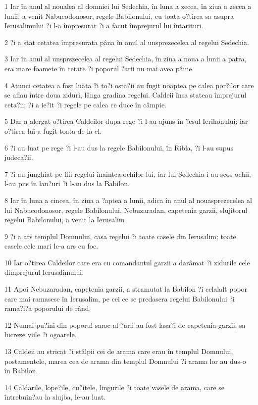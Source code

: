 \par 1 Iar în anul al noualea al domniei lui Sedechia, în luna a zecea, în ziua a zecea a lunii, a venit Nabucodonosor, regele Babilonului, cu toata o?tirea sa asupra Ierusalimului ?i l-a împresurat ?i a facut împrejurul lui întarituri.
\par 2 ?i a stat cetatea împresurata pâna în anul al unsprezecelea al regelui Sedechia.
\par 3 Iar în anul al unsprszecelea al regelui Sedechia, în ziua a noua a lunii a patra, era mare foamete în cetate ?i poporul ?arii nu mai avea pâine.
\par 4 Atunci cetatea a fost luata ?i to?i osta?ii au fugit noaptea pe calea por?ilor care se aflau între doua ziduri, lânga gradina regelui. Caldeii însa stateau împrejurul ceta?ii; ?i a ie?it ?i regele pe calea ce duce în câmpie.
\par 5 Dar a alergat o?tirea Caldeilor dupa rege ?i l-au ajuns în ?esul Ierihonului; iar o?tirea lui a fugit toata de la el.
\par 6 ?i au luat pe rege ?i l-au dus la regele Babilonului, în Ribla, ?i l-au supus judeca?ii.
\par 7 ?i au junghiat pe fiii regelui înaintea ochilor lui, iar lui Sedechia i-au scos ochii, l-au pus în lan?uri ?i l-au dus la Babilon.
\par 8 Iar în luna a cincea, în ziua a ?aptea a lunii, adica în anul al nouasprezecelea al lui Nabucodonosor, regele Babilonului, Nebuzaradan, capetenia garzii, slujitorul regelui Babilonului, a venit la Ierusalim
\par 9 ?i a ars templul Domnului, casa regelui ?i toate casele din Ierusalim; toate casele cele mari le-a ars cu foc.
\par 10 Iar o?tirea Caldeilor care era cu comandantul garzii a darâmat ?i zidurile cele dimprejurul Ierusalimului.
\par 11 Apoi Nebuzaradan, capetenia garzii, a stramutat la Babilon ?i celalalt popor care mai ramasese în Ierusalim, pe cei ce se predasera regelui Babilonului ?i rama?i?a poporului de rând.
\par 12 Numai pu?ini din poporul sarac al ?arii au fost lasa?i de capetenia garzii, sa lucreze viile ?i ogoarele.
\par 13 Caldeii au stricat ?i stâlpii cei de arama care erau în templul Domnului, postamentele, marea cea de arama din templul Domnului ?i arama lor au dus-o în Babilon.
\par 14 Caldarile, lope?ile, cu?itele, lingurile ?i toate vasele de arama, care se întrebuin?au la slujba, le-au luat.
